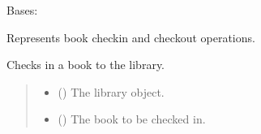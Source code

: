 \documentclass[letterpaper,10pt,english,openany,oneside]{sphinxmanual}
\begin{document}
\begin{fulllineitems}
\label{\detokenize{check:check.Check}}
\pysigstartsignatures
{}
\pysigstopsignatures
\sphinxAtStartPar
Bases: 

\sphinxAtStartPar
Represents book check\sphinxhyphen{}in and check\sphinxhyphen{}out operations.

\begin{fulllineitems}
\label{\detokenize{check:check.Check.check_in}}
\pysigstartsignatures
{}
\pysigstopsignatures
\sphinxAtStartPar
Checks in a book to the library.
\begin{quote}\begin{description}
\begin{itemize}
\item {} 
\sphinxAtStartPar
{} ({\hyperref[\detokenize{library:library.Library}]{}}) \textendash{} The library object.

\item {} 
\sphinxAtStartPar
{} ({\hyperref[\detokenize{book:book.Book}]{}}) \textendash{} The book to be checked in.

\end{itemize}

\end{description}\end{quote}

\end{fulllineitems}



\end{fulllineitems}
\end{document}
